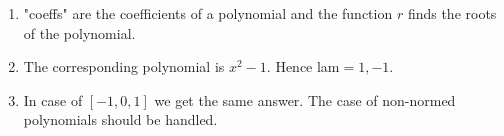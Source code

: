 {\color{solution}
\begin{enumerate}
	\item "coeffs" are the coefficients of a polynomial and the function $r$ finds the roots of the polynomial.
	\item The corresponding polynomial is $x^2-1$. Hence lam$=1,-1$.
	\item In case of $[-1,0,1]$ we get the same answer. The case of non-normed polynomials should be handled.
\end{enumerate}
}